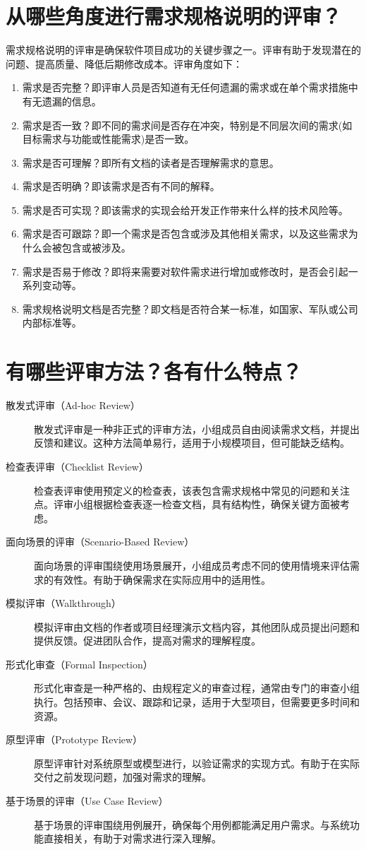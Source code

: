 \documentclass[11pt, a4paper, oneside]{ctexbook}
\begin{document}
\chapter{从哪些角度进行需求规格说明的评审？}
需求规格说明的评审是确保软件项目成功的关键步骤之一。评审有助于发现潜在的问题、提高质量、降低后期修改成本。评审角度如下：
\begin{enumerate}
    \item 需求是否完整？即评审人员是否知道有无任何遗漏的需求或在单个需求措施中有无遗漏的信息。
    \item 需求是否一致？即不同的需求间是否存在冲突，特别是不同层次间的需求(如目标需求与功能或性能需求)是否一致。
    \item 需求是否可理解？即所有文档的读者是否理解需求的意思。
    \item 需求是否明确？即该需求是否有不同的解释。
    \item 需求是否可实现？即该需求的实现会给开发正作带来什么样的技术风险等。
    \item 需求是否可跟踪？即一个需求是否包含或涉及其他相关需求，以及这些需求为什么会被包含或被涉及。
    \item 需求是否易于修改？即将来需要对软件需求进行增加或修改时，是否会引起一系列变动等。
    \item 需求规格说明文档是否完整？即文档是否符合某一标准，如国家、军队或公司内部标准等。
\end{enumerate}
\chapter{有哪些评审方法？各有什么特点？}
\begin{description}
    \item[散发式评审（Ad-hoc Review）] 散发式评审是一种非正式的评审方法，小组成员自由阅读需求文档，并提出反馈和建议。这种方法简单易行，适用于小规模项目，但可能缺乏结构。
    \item[检查表评审（Checklist Review）] 检查表评审使用预定义的检查表，该表包含需求规格中常见的问题和关注点。评审小组根据检查表逐一检查文档，具有结构性，确保关键方面被考虑。
    \item[面向场景的评审（Scenario-Based Review）] 面向场景的评审围绕使用场景展开，小组成员考虑不同的使用情境来评估需求的有效性。有助于确保需求在实际应用中的适用性。
    \item[模拟评审（Walkthrough）] 模拟评审由文档的作者或项目经理演示文档内容，其他团队成员提出问题和提供反馈。促进团队合作，提高对需求的理解程度。
    \item[形式化审查（Formal Inspection）] 形式化审查是一种严格的、由规程定义的审查过程，通常由专门的审查小组执行。包括预审、会议、跟踪和记录，适用于大型项目，但需要更多时间和资源。
    \item[原型评审（Prototype Review）] 原型评审针对系统原型或模型进行，以验证需求的实现方式。有助于在实际交付之前发现问题，加强对需求的理解。
    \item[基于场景的评审（Use Case Review）] 基于场景的评审围绕用例展开，确保每个用例都能满足用户需求。与系统功能直接相关，有助于对需求进行深入理解。
\end{description}
\end{document}
